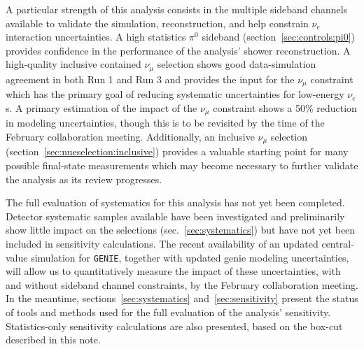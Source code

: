 \par A particular strength of this analysis consists in the multiple sideband channels available to validate the simulation, reconstruction, and help constrain $\nu_e$ interaction uncertainties. A high statistics $\pi^0$ sideband (section~\ref{sec:controls:pi0}) provides confidence in the performance of the analysis' shower reconstruction. A high-quality inclusive contained $\nu_{\mu}$ selection shows good data-simulation agreement in both Run 1 and Run 3 and provides the input for the $\nu_{\mu}$ constraint which has the primary goal of reducing systematic uncertainties for low-energy $\nu_e$s. A primary estimation of the impact of the $\nu_{\mu}$ constraint shows a 50\% reduction in modeling uncertainties, though this is to be revisited by the time of the February collaboration meeting. Additionally, an inclusive $\nu_{\mu}$ selection (section~\ref{sec:nueselection:inclusive}) provides a valuable starting point for many possible final-state measurements which may become necessary to further validate the analysis as its review progresses. 
\par The full evaluation of systematics for this analysis has not yet been completed. Detector systematic samples available have been investigated and preliminarily show little impact on the selections (sec.~\ref{sec:systematics}) but have not yet been included in sensitivity calculations. The recent availability of an updated central-value simulation for \texttt{GENIE}, together with updated genie modeling uncertainties, will allow us to quantitatively measure the impact of these uncertainties, with and without sideband channel constraints, by the February collaboration meeting. In the meantime, sections~\ref{sec:systematics} and~\ref{sec:sensitivity} present the status of tools and methods used for the full evaluation of the analysis' sensitivity. Statistics-only sensitivity calculations are also presented, based on the box-cut \npsel described in this note.


\newpage
